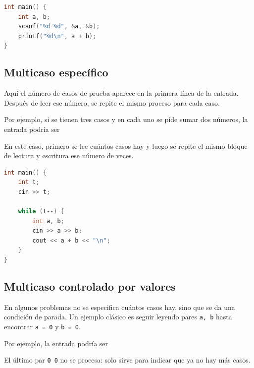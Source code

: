 \begin{lstlisting}[language=C++]
int main() {
    int a, b;
    scanf("%d %d", &a, &b);
    printf("%d\n", a + b);
}
\end{lstlisting}

\subsection{Multicaso específico}

Aquí el número de casos de prueba aparece en la primera línea de la entrada. Después de leer ese número, se repite el mismo proceso para cada caso.

Por ejemplo, si se tienen tres casos y en cada uno se pide sumar dos números, la entrada podría ser


En este caso, primero se lee cuántos casos hay y luego se repite el mismo bloque de lectura y escritura ese número de veces.

\begin{lstlisting}[language=C++]
int main() {
    int t;
    cin >> t;

    while (t--) {
        int a, b;
        cin >> a >> b;
        cout << a + b << "\n";
    }
}
\end{lstlisting}

\subsection{Multicaso controlado por valores}

En algunos problemas no se especifica cuántos casos hay, sino que se da una condición de parada. Un ejemplo clásico es seguir leyendo pares \texttt{a, b} hasta encontrar \texttt{a = 0} y \texttt{b = 0}.

Por ejemplo, la entrada podría ser


El último par \texttt{0 0} no se procesa: solo sirve para indicar que ya no hay más casos.

